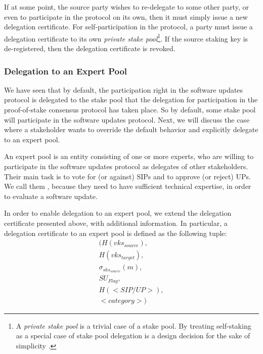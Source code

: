 If at some point, the source party wishes to re-delegate to some other party, or even to participate in the protocol on its own, then it must simply issue a new delegation certificate. For self-participation in the protocol, a party must issue a delegation certificate to its own \emph{private stake pool}\footnote{A \emph{private stake pool} is a trivial case of a stake pool. By treating self-staking as a special case of stake pool delegation is a design decision for the sake of simplicity \cite{deldesign}.}. If the source staking key is de-registered, then the delegation certificate is revoked.

\subsubsection*{Delegation to an Expert Pool}
We have seen that by default, the participation right in the software updates protocol is delegated to the stake pool that the delegation for participation in the proof-of-stake consensus protocol has taken place. So by default, some stake pool will participate in the software updates protocol. Next, we will discuss the case where a stakeholder wants to override the default behavior and explicitly delegate to an expert pool.

An expert pool is an entity consisting of one or more experts, who are willing to participate in the software updates protocol as delegates of other stakeholders. Their main task is to vote for (or against) SIPs and to approve (or reject) UPs. We call them , because they need to have sufficient technical expertise, in order to evaluate a software update.

In order to enable delegation to an expert pool, we extend the delegation certificate presented above, with additional information. In particular, a delegation certificate to an expert pool is defined as the following tuple:
\begin{align*}
(H(vks_{source}), \\
 H(vks_{target}), \\
 \sigma_{sks_{source}}(m), \\
 SU_{Flag}, \\
 H(<SIP/UP>), \\
 <category>)
\end{align*}

